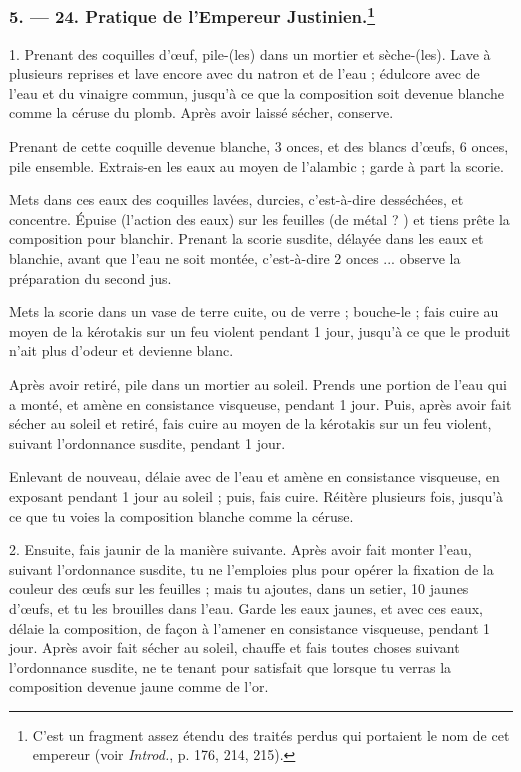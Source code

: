 \documentclass[a4paper, 11pt, oneside, polutonikogreek, french]{article}
\begin{document}
\bigskip
\centerline{\EightStarTaper}
\centerline{\EightStarTaper\EightStarTaper}
\bigskip

\subsubsection[5. --- 24. Pratique de l'Empereur Justinien.]{5. --- 24. Pratique de l'Empereur Justinien.\footnote{C'est un fragment assez étendu des traités perdus qui portaient le nom de cet empereur (voir \emph{Introd.}, p. 176, 214, 215).}}

1. Prenant des coquilles d'œuf, pile-(les) dans un mortier et sèche-(les). Lave à plusieurs reprises et lave encore avec du natron et de l'eau ; édulcore avec de l'eau et du vinaigre commun, jusqu'à ce que la composition soit devenue blanche comme la céruse du plomb. Après avoir laissé sécher, conserve.

Prenant de cette coquille devenue blanche, 3 onces, et des blancs d'œufs, 6 onces, pile ensemble. Extrais-en les eaux au moyen de l'alambic ; garde à part la scorie.

Mets dans ces eaux des coquilles lavées, durcies, c'est-à-dire desséchées, et concentre. Épuise (l'action des eaux) sur les feuilles (de métal ? ) et tiens prête la composition pour blanchir. Prenant la scorie susdite, délayée dans les eaux et blanchie, avant que l'eau ne soit montée, c'est-à-dire 2 onces ... observe la préparation du second jus.

Mets la scorie dans un vase de terre cuite, ou de verre ; bouche-le ; fais cuire au moyen de la kérotakis sur un feu violent pendant 1 jour, jusqu'à ce que le produit n'ait plus d'odeur et devienne blanc.

Après avoir retiré, pile dans un mortier au soleil. Prends une portion de l'eau qui a monté, et amène en consistance visqueuse, pendant 1 jour. Puis, après avoir fait sécher au soleil et retiré, fais cuire au moyen de la kérotakis sur un feu violent, suivant l'ordonnance susdite, pendant 1 jour.

Enlevant de nouveau, délaie avec de l'eau et amène en consistance visqueuse, en exposant pendant 1 jour au soleil ; puis, fais cuire. Réitère plusieurs fois, jusqu'à ce que tu voies la composition blanche comme la céruse.

2. Ensuite, fais jaunir de la manière suivante. Après avoir fait monter l'eau, suivant l'ordonnance susdite, tu ne l'emploies plus pour opérer la fixation de la couleur des œufs sur les feuilles ; mais tu ajoutes, dans un setier, 10 jaunes d'œufs, et tu les brouilles dans l'eau. Garde les eaux jaunes, et avec ces eaux, délaie la composition, de façon à l'amener en consistance visqueuse, pendant 1 jour. Après avoir fait sécher au soleil, chauffe et fais toutes choses suivant l'ordonnance susdite, ne te tenant pour satisfait que lorsque tu verras la composition devenue jaune comme de l'or.
\end{document}
